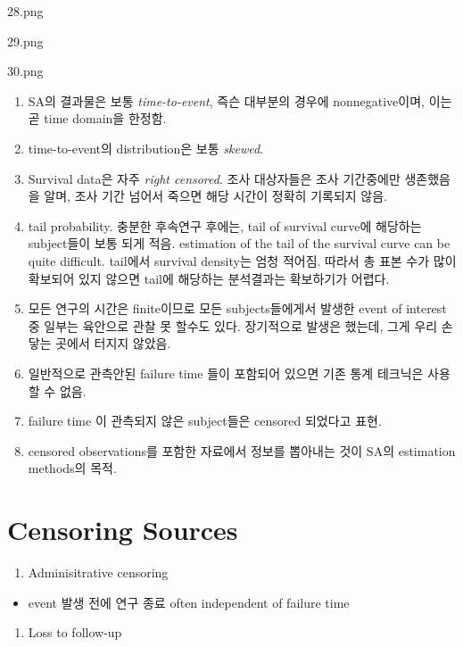 \documentclass[
]{book}
\providecommand{\tightlist}{%
  \setlength{\itemsep}{0pt}\setlength{\parskip}{0pt}}
\theoremstyle{definition}
\theoremstyle{definition}
\theoremstyle{definition}
\theoremstyle{definition}
\theoremstyle{remark}
\begin{document}
28.png

29.png

30.png

\begin{enumerate}
\def\labelenumi{\arabic{enumi}.}
\item
  SA의 결과물은 보통 \emph{time-to-event}, 즉슨 대부분의 경우에 nonnegative이며, 이는 곧 time domain을 한정함.
\item
  time-to-event의 distribution은 보통 \emph{skewed}.
\item
  Survival data은 자주 \emph{right censored}. 조사 대상자들은 조사 기간중에만 생존했음을 알며, 조사 기간 넘어서 죽으면 해당 시간이 정확히 기록되지 않음.
\item
  tail probability. 충분한 후속연구 후에는, tail of survival curve에 해당하는 subject들이 보통 되게 적음. estimation of the tail of the survival curve can be quite difficult. tail에서 survival density는 엄청 적어짐. 따라서 총 표본 수가 많이 확보되어 있지 않으면 tail에 해당하는 분석결과는 확보하기가 어렵다.
\item
  모든 연구의 시간은 finite이므로 모든 subjects들에게서 발생한 event of interest 중 일부는 육안으로 관찰 못 할수도 있다. 장기적으로 발생은 했는데, 그게 우리 손닿는 곳에서 터지지 않았음.
\item
  일반적으로 관측안된 failure time 들이 포함되어 있으면 기존 통계 테크닉은 사용할 수 없음.
\item
  failure time 이 관측되지 않은 subject들은 censored 되었다고 표현.
\item
  censored observations를 포함한 자료에서 정보를 뽑아내는 것이 SA의 estimation methods의 목적.
\end{enumerate}

\hypertarget{censoring-sources}{%
\chapter{Censoring Sources}\label{censoring-sources}}

\begin{enumerate}
\def\labelenumi{\arabic{enumi}.}
\tightlist
\item
  Adminisitrative censoring
\end{enumerate}

\begin{itemize}
\tightlist
\item
  event 발생 전에 연구 종료
  often independent of failure time
\end{itemize}

\begin{enumerate}
\def\labelenumi{\arabic{enumi}.}
\setcounter{enumi}{1}
\tightlist
\item
  Loss to follow-up
\end{enumerate}
\end{document}
